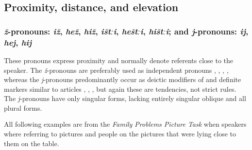 \subsection{Proximity, distance, and elevation}
\label{ssec:Proximity, distance, cardinal directions, and height The six horizontal series}



\subsubsection{\textit{ž}-pronouns: \textit{iž}, \textit{hež}, \textit{hiž}, \textit{ištːi}, \textit{heštːi}, \textit{hištːi}; and \textit{j}-pronouns: \textit{ij}, \textit{hej}, \textit{hij}}
\label{sssec:z-pronouns j-pronouns}

These pronouns express proximity and normally denote referents close to the speaker. The \textit{ž}-pronouns are preferably used as independent pronouns , , , , where\-as the \textit{j}-pronouns predominantly occur as deictic modifiers of  and definite markers similar to articles , , , but again these are tendencies, not strict rules. The \textit{j}-pronouns have only singular  forms, lacking entirely singular oblique and all plural forms.

All following examples are from the \textit{Family Problems Picture Task} when speakers where referring to pictures and people on the pictures that were lying close to them on the table.

